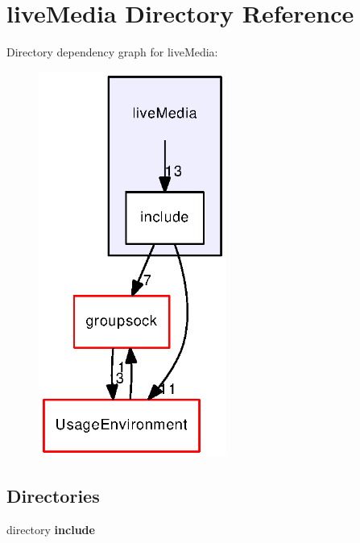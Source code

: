 \section{live\+Media Directory Reference}
\label{dir_267e5e90fd6f88b17498dda22e843319}
Directory dependency graph for live\+Media\+:
\nopagebreak
\begin{figure}[H]
\begin{center}
\leavevmode
\includegraphics[width=175pt]{dir_267e5e90fd6f88b17498dda22e843319_dep}
\end{center}
\end{figure}
\subsection*{Directories}
\begin{DoxyCompactItemize}
\item 
directory {\bf include}
\end{DoxyCompactItemize}
